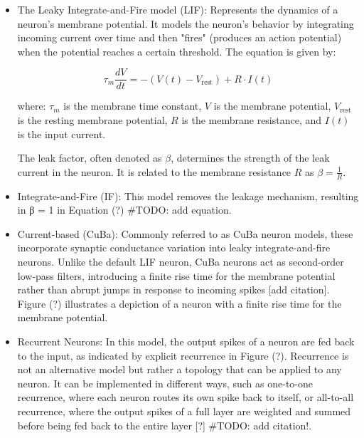 \begin{itemize}

    \item The Leaky Integrate-and-Fire model (LIF): Represents the dynamics of a neuron's membrane potential. It models the neuron's behavior by integrating incoming current over time and then "fires" (produces an action potential) when the potential reaches a certain threshold. The equation is given by:
    
    \begin{equation}
    \tau_m \frac{{dV}}{{dt}} = -(V(t) - V_{\text{rest}}) + R \cdot I(t)
    \end{equation}
    
    where:
    \( \tau_m \) is the membrane time constant,
    \( V \) is the membrane potential,
    \( V_{\text{rest}} \) is the resting membrane potential,
    \( R \) is the membrane resistance,
    and \( I(t) \) is the input current.
    
    The leak factor, often denoted as \( \beta \), determines the strength of the leak current in the neuron. It is related to the membrane resistance \( R \) as \( \beta = \frac{1}{R} \).

    \item Integrate-and-Fire (IF): This model removes the leakage mechanism, resulting in β = 1 in Equation (?)  #TODO: add equation.
    
    \item Current-based (CuBa): Commonly referred to as CuBa neuron models, these incorporate synaptic conductance variation into leaky integrate-and-fire neurons. Unlike the default LIF neuron, CuBa neurons act as second-order low-pass filters, introducing a finite rise time for the membrane potential rather than abrupt jumps in response to incoming spikes [add citation]. Figure (?) illustrates a depiction of a neuron with a finite rise time for the membrane potential.
    
    \item Recurrent Neurons: In this model, the output spikes of a neuron are fed back to the input, as indicated by explicit recurrence in Figure (?). Recurrence is not an alternative model but rather a topology that can be applied to any neuron. It can be implemented in different ways, such as one-to-one recurrence, where each neuron routes its own spike back to itself, or all-to-all recurrence, where the output spikes of a full layer are weighted and summed before being fed back to the entire layer [?] #TODO: add citation!.


\end{itemize}

